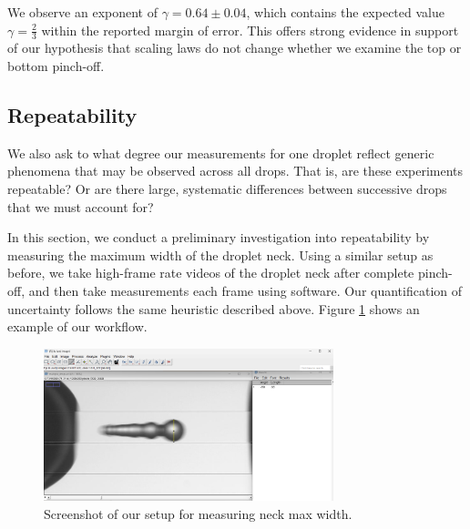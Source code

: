 \documentclass[12pt, letterpaper]{article}
\begin{document}
We observe an exponent of $\gamma=0.64 \pm 0.04$, which contains the expected value $\gamma=\frac{2}{3}$ within the reported margin of error. This offers strong evidence in support of our hypothesis that scaling laws do not change whether we examine the top or bottom pinch-off. 

\subsection{Repeatability}

We also ask to what degree our measurements for one droplet reflect generic phenomena that may be observed across all drops. That is, are these experiments repeatable? Or are there large, systematic differences between successive drops that we must account for? 

In this section, we conduct a preliminary investigation into repeatability by measuring the maximum width of the droplet neck. Using a similar setup as before, we take high-frame rate videos of the droplet neck after complete pinch-off, and then take measurements each frame using software. Our quantification of uncertainty follows the same heuristic described above. Figure \ref{fig:measurement2} shows an example of our workflow. 
\begin{figure}[!h]
    \centering
    \includegraphics[width=0.75\textwidth]{experiment3/figures/screenshots/measurement2.png}
    \caption{Screenshot of our setup for measuring neck max width. }
    \label{fig:measurement2}
\end{figure}
\end{document}
